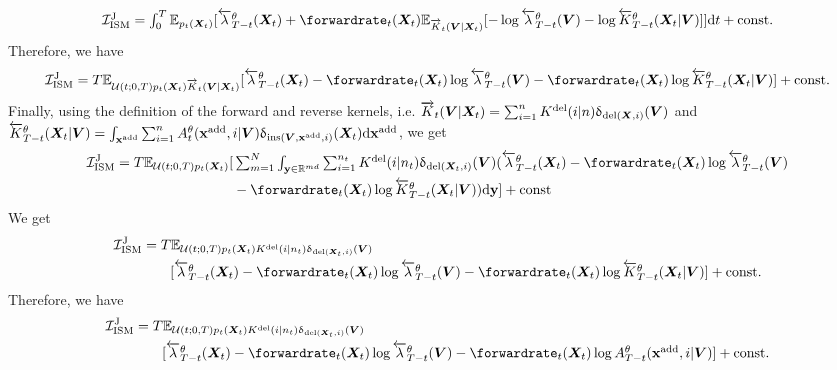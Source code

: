 \begin{align}
  \textstyle 
    \mathcal{I}_{\text{ISM}}^{\text{J}} = \int_{0}^T \mathbb{E}_{p_t(\mX_t)} [ \backwardrate_{T-t}^\theta(\mX_t) + \forwardrate_t(\mX_t) \mathbb{E}_{\ftk_t(\mV | \mX_t)} [ - \log \backwardrate_{T-t}^\theta(\mV) - \log \btk_{T-t}^\theta(\mX_t | \mV) ] ] \rmd t + \text{const} . 
\end{align}
Therefore, we have 
\begin{align}
   \mathcal{I}_{\text{ISM}}^{\text{J}} =  T\mathbb{E}_{\mathcal{U}(t; 0, T) p_t(\mX_t) \ftk_t(\mV | \mX_t) } [ \backwardrate_{T-t}^\theta(\mX_t) - \forwardrate_t(\mX_t) \log \backwardrate_{T-t}^\theta(\mV) - \forwardrate_t(\mX_t) \log \btk_{T-t}^\theta(\mX_t | \mV) ] + \text{const} . 
\end{align}
Finally, using  the definition of the forward and reverse kernels, i.e.
$\overrightarrow{K}_t({\bm{V}} | {\bm{X}}_t) = \sum_{i=1}^n K^{\textup{del}}(i | n) \updelta_{\text{del}({\bm{X}},
  i)}({\bm{V}})$ and
$\overleftarrow{K}_{T-t}^\theta({\bm{X}}_t | {\bm{V}}) = \int_{{\mathbf{x}}^{\textup{add}}} \sum_{i=1}^{n}
A^\theta_t({\mathbf{x}}^{\textup{add}}, i | {\bm{V}}) \updelta_{\text{ins}({\bm{V}}, {\mathbf{x}}^{\textup{add}}, i)}({\bm{X}}_t) \mathrm{d}
{\mathbf{x}}^{\textup{add}}$, we get
\begin{align}
   \mathcal{I}_{\text{ISM}}^{\text{J}} =  T\mathbb{E}_{\mathcal{U}(t; 0, T) p_t(\mX_t) } [&\textstyle  \inty \sum_{i=1}^{n_t} \delidxdist(i | n_t) \updelta_{\text{del}(\mX_t, i)}(\mV) ( \backwardrate_{T-t}^\theta(\mX_t) - \forwardrate_t(\mX_t) \log \backwardrate_{T-t}^\theta(\mV) \\ 
    &\textstyle - \forwardrate_t(\mX_t) \log \btk_{T-t}^\theta(\mX_t | \mV) ) \rmd \y ] + \text{const} 
\end{align}
We get 
\begin{align}
  \mathcal{I}_{\text{ISM}}^{\text{J}} &=  T\mathbb{E}_{\mathcal{U}(t; 0, T) p_t(\mX_t) \delidxdist(i | n_t) \updelta_{\text{del}(\mX_t, i)}(\mV) } \\
  & \qquad [\textstyle  \backwardrate_{T-t}^\theta(\mX_t) - \forwardrate_t(\mX_t) \log \backwardrate_{T-t}^\theta(\mV) - \forwardrate_t(\mX_t) \log \btk_{T-t}^\theta(\mX_t | \mV) ] + \text{const} . 
\end{align}
Therefore, we have 
\begin{align}
  \mathcal{I}_{\text{ISM}}^{\text{J}} &=  T\mathbb{E}_{\mathcal{U}(t; 0, T) p_t(\mX_t) \delidxdist(i | n_t) \updelta_{\text{del}(\mX_t, i)}(\mV) } \\
                                      &\qquad [\textstyle  \backwardrate_{T-t}^\theta(\mX_t) - \forwardrate_t(\mX_t) \log \backwardrate_{T-t}^\theta(\mV) - \forwardrate_t(\mX_t) \log A_{T-t}^\theta(\xadd, i | \mV) ] + \text{const} . 
\end{align}

